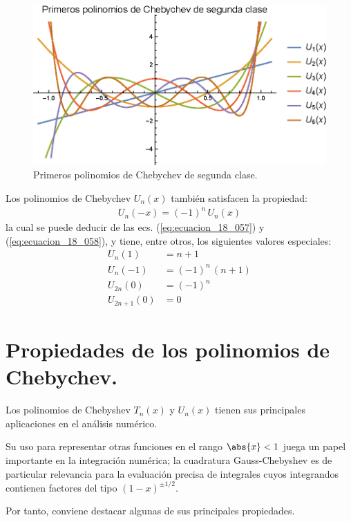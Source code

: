 \begin{figure}[H]
    \centering
    \includegraphics[scale=1]{Imagenes/Plot_Polinomios_Chebychev_02.eps}
    \caption{Primeros polinomios de Chebychev de segunda clase.}
    \label{fig:figura_plot_chebychev_02}
\end{figure}
Los polinomios de Chebychev $U_{n}(x)$ también satisfacen la propiedad:
\begin{align*}
U_{n} (-x) = (-1)^{n} \, U_{n} (x)
\end{align*}
la cual se puede deducir de las ecs. (\ref{eq:ecuacion_18_057}) y (\ref{eq:ecuacion_18_058}), y tiene, entre otros, los siguientes valores especiales:
\begin{align*}
U_{n} (1) &= n + 1 \\[0.5em]
U_{n} (-1) &= (-1)^{n} \, (n + 1) \\[0.5em]
U_{2n} (0) &= (-1)^{n} \\[0.5em]
U_{2n+1} (0) &= 0
\end{align*}

\section{Propiedades de los polinomios de Chebychev.}

Los polinomios de Chebyshev $T_{n} (x)$ y $U_{n} (x)$ tienen sus principales aplicaciones en el análisis numérico.
\par
Su uso para representar otras funciones en el rango $\abs{x} < 1$ juega un papel importante en la integración numérica; la cuadratura Gauss-Chebyshev es de particular relevancia para la evaluación precisa de integrales cuyos integrandos contienen factores del tipo $(1 - x)^{\pm 1/2}$.
\par
Por tanto, conviene destacar algunas de sus principales propiedades.
